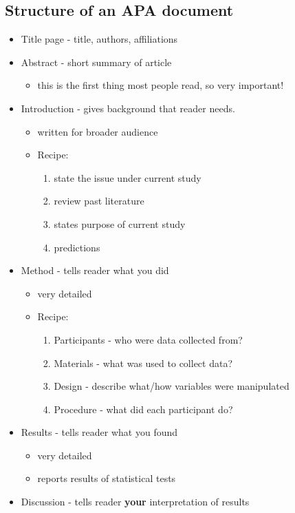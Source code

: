 \documentclass[11pt]{article}
\begin{document}
\subsection*{Structure of an APA document}
\label{sec-2-4}
\begin{itemize}
\item Title page - title, authors, affiliations
\item Abstract - short summary of article
\begin{itemize}
\item this is the first thing most people read, so very important!
\end{itemize}
\item Introduction - gives background that reader needs. 
\begin{itemize}
\item written for broader audience
\item Recipe:
\begin{enumerate}
\item state the issue under current study
\item review past literature
\item states purpose of current study
\item predictions
\end{enumerate}
\end{itemize}
\item Method - tells reader what you did
\begin{itemize}
\item very detailed
\item Recipe:
\begin{enumerate}
\item Participants - who were data collected from?
\item Materials - what was used to collect data?
\item Design - describe what/how variables were manipulated
\item Procedure - what did each participant do?
\end{enumerate}
\end{itemize}
\item Results - tells reader what you found
\begin{itemize}
\item very detailed
\item reports results of statistical tests
\end{itemize}
\item Discussion - tells reader \textbf{your} interpretation of results

\end{itemize}
\end{document}
